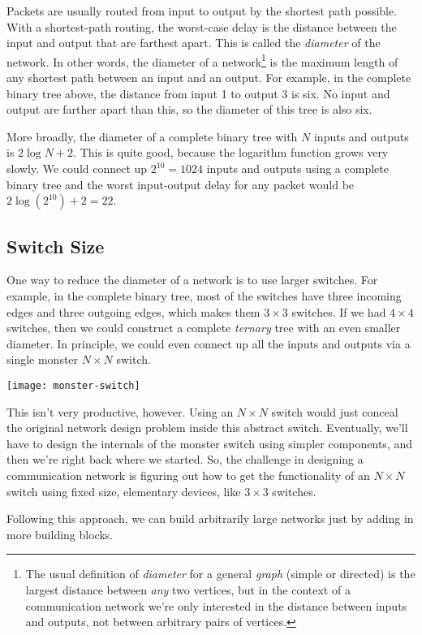 Packets are usually routed from input to output by the shortest
path possible.  With a shortest-path routing, the worst-case delay is the
distance between the input and output that are farthest apart.  This is
called the \emph{diameter}%
of the network.  In other words, the diameter
of a network\footnote{The usual definition of \emph{diameter}%
for a general \textit{graph} (simple or directed) is the largest distance
between \emph{any} two vertices, but in the context of a communication
network we're only interested in the distance between inputs and outputs,
not between arbitrary pairs of vertices.} is the maximum length of any
shortest path between an input and an output.  For example, in the
complete binary tree above, the distance from input 1 to output 3 is six.
No input and output are farther apart than this, so the diameter of this
tree is also six.

More broadly, the diameter of a complete binary tree with $N$ inputs
and outputs is $2 \log N + 2$.  This is quite good, because the
logarithm function grows very slowly.  We could connect up $2^{10} =
1024$ inputs and outputs using a complete binary tree and the worst
input-output delay for any packet would be $2 \log(2^{10}) + 2 = 22$.

\subsection{Switch Size}

One way to reduce the diameter of a network is to use larger switches.
For example, in the complete binary tree, most of the switches have
three incoming edges and three outgoing edges, which makes them $3
\times 3$ switches.  If we had $4 \times 4$ switches, then we could
construct a complete \textit{ternary} tree with an even smaller
diameter.  In principle, we could even connect up all the inputs and
outputs via a single monster $N \times N$ switch.

\begin{editingnotes}
\texttt{[image: monster-switch]}
\end{editingnotes}

This isn't very productive, however. Using an $N \times N$ switch
would just conceal the original network design problem inside this
abstract switch.  Eventually, we'll have to design the internals of
the monster switch using simpler components, and then we're right back
where we started.  So, the challenge in designing a communication
network is figuring out how to get the functionality of an $N \times
N$ switch using fixed size, elementary devices, like $3 \times 3$
switches.
\begin{solution}
Following this approach, we can build arbitrarily large networks
just by adding in more building blocks. 
\end{solution}

